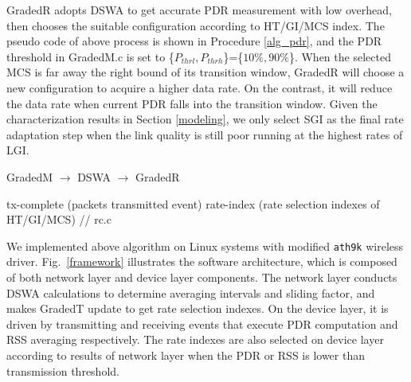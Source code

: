 \documentclass[draftclsnofoot,journal,onecolumn,11pt]{IEEEtran}
\begin{document}
GradedR adopts DSWA to get accurate PDR measurement with low overhead, then chooses the suitable configuration according to HT/GI/MCS index. The pseudo code of above process is shown in Procedure \ref{alg_pdr}, and the PDR threshold in GradedM.c is set to \{$P_{thrl},P_{thrh}$\}=\{$10\%,90\%$\}. When the selected MCS is far away the right bound of its transition window, GradedR will choose a new configuration to acquire a higher data rate. On the contrast, it will reduce the data rate when current PDR falls into the transition window. Given the characterization results in Section \ref{modeling}, we only select SGI as the final rate adaptation step when the link quality is still poor running at the highest rates of LGI.
\begin{algorithm}[!t]
\renewcommand{\algorithmicrequire}{\textbf{Input:}}
\renewcommand{\algorithmicensure}{\textbf{Output:}}
\caption{GradedM $\rightarrow$ DSWA $\rightarrow$ GradedR}
\label{alg_pdr}
\begin{algorithmic}[1]
\Require tx-complete (packets transmitted event)
\Ensure  rate-index (rate selection indexes of HT/GI/MCS)
 // rc.c
\EndIf
{}
\EndIf
\State {}
\end{algorithmic}
\end{algorithm}

We implemented above algorithm on Linux systems with modified \texttt{ath9k} wireless driver. Fig.~\ref{framework} illustrates the software architecture, which is composed of both network layer and device layer components. The network layer conducts DSWA calculations to determine averaging intervals and sliding factor, and makes GradedT update to get rate selection indexes. On the device layer, it is driven by transmitting and receiving events that execute PDR computation and RSS averaging respectively. The rate indexes are also selected on device layer according to results of network layer when the PDR or RSS is lower than transmission threshold.



\renewcommand\refname{References}
%


\end{document}
